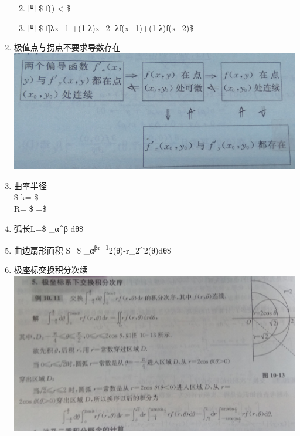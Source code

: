 \documentclass[11pt]{article}
\makeatletter
\def\maxwidth{\ifdim\Gin@nat@width>\linewidth\linewidth
    \else\Gin@nat@width\fi}
\let\Oldincludegraphics\includegraphics
\renewcommand{\includegraphics}[1]{\Oldincludegraphics[width=.8\maxwidth]{#1}}
\providecommand{\tightlist}{%
      \setlength{\itemsep}{0pt}\setlength{\parskip}{0pt}}
\makeatother
\begin{document}
\begin{enumerate}
  \begin{enumerate}
  \def\labelenumii{\arabic{enumii}.}
  \tightlist
  \item
    凹 \$ f() \textless{} \$\\
  \item
    凹 \$ f{[}λx\_1 +(1-λ)x\_2{]} \leq λf(x\_1)+(1-λ)f(x\_2)\$\\
  \end{enumerate}
\item
  极值点与拐点不要求导数存在\\
  \includegraphics{9345E7/2367085874.jpg}\\
\item
  曲率半径\\
  \$ k= \$\\
  R= \$ =\$\\
\item
  弧长L=\$ \int\_α\^{}β dθ\$\\
\item
  曲边扇形面积 S=\$ 
  \int\_α\textsuperscript{β\textbar{}r\_1}2(θ)-r\_2\^{}2(θ)\textbar{}dθ\$\\
\item
  极座标交换积分次续\\
  \includegraphics{9345E7/3720754172.jpg}\\

\end{enumerate}
\end{document}

